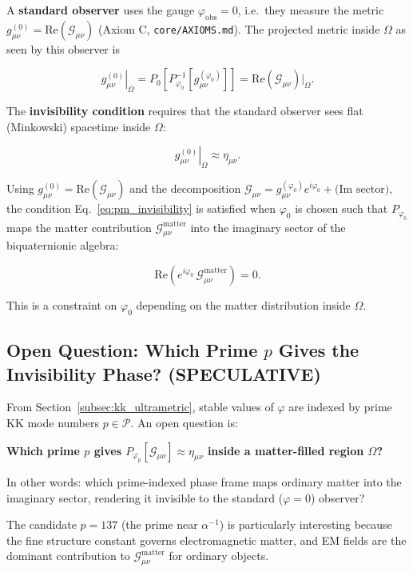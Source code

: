 A \textbf{standard observer} uses the gauge $\varphi_\mathrm{obs} = 0$, i.e.\ they measure the
metric $g_{\mu\nu}^{(0)} = \mathrm{Re}(\mathcal{G}_{\mu\nu})$ (Axiom C,
\texttt{core/AXIOMS.md}).  The projected metric inside $\Omega$ as seen by this observer is

\begin{equation}
\label{eq:pm_obs_metric}
\left.g_{\mu\nu}^{(0)}\right|_\Omega
= P_0\!\left[P_{\varphi_0}^{-1}\!\left[g_{\mu\nu}^{(\varphi_0)}\right]\right]
= \mathrm{Re}(\mathcal{G}_{\mu\nu})\Big|_\Omega.
\end{equation}

The \textbf{invisibility condition} requires that the standard observer sees flat (Minkowski)
spacetime inside $\Omega$:

\begin{equation}
\label{eq:pm_invisibility}
\left.g_{\mu\nu}^{(0)}\right|_\Omega \approx \eta_{\mu\nu}.
\end{equation}

Using $g_{\mu\nu}^{(0)} = \mathrm{Re}(\mathcal{G}_{\mu\nu})$ and the decomposition
$\mathcal{G}_{\mu\nu} = g_{\mu\nu}^{(\varphi_0)} e^{i\varphi_0} + \text{(Im sector)}$, the
condition Eq.~\eqref{eq:pm_invisibility} is satisfied when $\varphi_0$ is chosen such that
$P_{\varphi_0}$ maps the matter contribution $\mathcal{G}_{\mu\nu}^\mathrm{matter}$ into the
imaginary sector of the biquaternionic algebra:

\begin{equation}
\label{eq:pm_invisibility_cond}
\mathrm{Re}\!\left(e^{i\varphi_0}\,\mathcal{G}_{\mu\nu}^\mathrm{matter}\right) = 0.
\end{equation}

This is a constraint on $\varphi_0$ depending on the matter distribution inside $\Omega$.

\subsection{Open Question: Which Prime $p$ Gives the Invisibility Phase? (SPECULATIVE)}

From Section~\ref{subsec:kk_ultrametric}, stable values of $\varphi$ are indexed by prime KK
mode numbers $p \in \mathcal{P}$.  An open question is:

\begin{tcolorbox}[colback=yellow!5!white,colframe=yellow!75!black,title=Open Question (SPECULATIVE)]
\textbf{Which prime $p$ gives $P_{\varphi_p}[\mathcal{G}_{\mu\nu}] \approx \eta_{\mu\nu}$
inside a matter-filled region $\Omega$?}

In other words: which prime-indexed phase frame maps ordinary matter into the imaginary sector,
rendering it invisible to the standard ($\varphi = 0$) observer?

The candidate $p = 137$ (the prime near $\alpha^{-1}$) is particularly interesting because the
fine structure constant governs electromagnetic matter, and EM fields are the dominant contribution
to $\mathcal{G}_{\mu\nu}^\mathrm{matter}$ for ordinary objects.
\end{tcolorbox}

